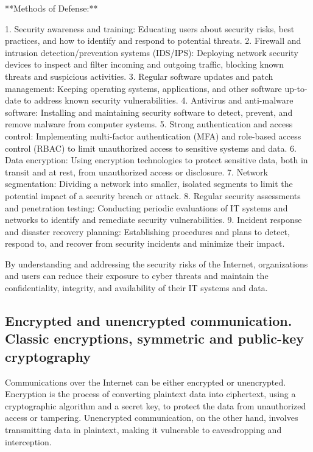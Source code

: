 \documentclass{article}
\begin{document}
**Methods of Defense:**

1. Security awareness and training: Educating users about security risks, best practices, and how to identify and respond to potential threats.
2. Firewall and intrusion detection/prevention systems (IDS/IPS): Deploying network security devices to inspect and filter incoming and outgoing traffic, blocking known threats and suspicious activities.
3. Regular software updates and patch management: Keeping operating systems, applications, and other software up-to-date to address known security vulnerabilities.
4. Antivirus and anti-malware software: Installing and maintaining security software to detect, prevent, and remove malware from computer systems.
5. Strong authentication and access control: Implementing multi-factor authentication (MFA) and role-based access control (RBAC) to limit unauthorized access to sensitive systems and data.
6. Data encryption: Using encryption technologies to protect sensitive data, both in transit and at rest, from unauthorized access or disclosure.
7. Network segmentation: Dividing a network into smaller, isolated segments to limit the potential impact of a security breach or attack.
8. Regular security assessments and penetration testing: Conducting periodic evaluations of IT systems and networks to identify and remediate security vulnerabilities.
9. Incident response and disaster recovery planning: Establishing procedures and plans to detect, respond to, and recover from security incidents and minimize their impact.

By understanding and addressing the security risks of the Internet, organizations and users can reduce their exposure to cyber threats and maintain the confidentiality, integrity, and availability of their IT systems and data.


\subsection{Encrypted and unencrypted communication. Classic encryptions, symmetric and public-key cryptography}

Communications over the Internet can be either encrypted or unencrypted. Encryption is the process of converting plaintext data into ciphertext, using a cryptographic algorithm and a secret key, to protect the data from unauthorized access or tampering. Unencrypted communication, on the other hand, involves transmitting data in plaintext, making it vulnerable to eavesdropping and interception.
\end{document}
